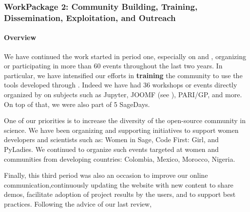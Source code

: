 \subsubsection{WorkPackage 2:  Community Building, Training, Dissemination, Exploitation, and Outreach}
\label{dissem}



\paragraph{Overview}

  We have continued the work started in period one, especially on  and
  , organizing or participating in more than 60 events throughout the last two years.
  In particular, we have intensified our efforts in \textbf{training} the community to use the tools developed through \ODK.
  Indeed we have had 36 workshops or events directly organized by \ODK on subjects such as Jupyter, JOOMF (see ), PARI/GP, and more. On top of that, we were also part of 5 SageDays.

  One of our priorities is to increase the diversity of the open-source community in science. We have been organizing
  and supporting initiatives to support women developers and scientists such as: Women in Sage, Code First: Girl, and
  PyLadies. We continued to organize such events targeted at women and communities from developing countries: Colombia, Mexico, Morocco, Nigeria.

  Finally, this third period was also an occasion to improve our online communication,continuously updating the website with new content to share demos, facilitate adoption of project results by the users, and to support best practices.
  Following the advice of our last review, %
  
